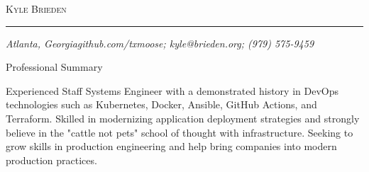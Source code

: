 \documentclass[10pt,oneside]{article}
\makeatletter
\newcommand{\name}{Kyle Brieden}
\newcommand{\addr}{Atlanta, Georgia}
\newcommand{\phone}{(979) 575-9459}
\newcommand{\email}{kyle@brieden.org}
\newcommand{\github}{github.com/txmoose}
\newcommand{\bigname}[1]{
    \begin{center}\fontfamily{phv}\selectfont\Huge\scshape#1\end{center}
}
\newenvironment{ressection}[1]{
    \vspace{4pt}
    {\fontfamily{phv}\selectfont\Large#1}
    \begin{itemize}
    \vspace{3pt}
}{
    \end{itemize}
}
\makeatother
\begin{document}
 \selectfont

\bigname{\name}

\vspace{-8pt} \rule{\textwidth}{1pt}

\vspace{-1pt} {\small\itshape \addr \hfill \github; \email; \phone}

\vspace{8 pt}

\begin{ressection}{Professional Summary}

    \begin{resobj}{Experienced Staff Systems Engineer with a demonstrated history in DevOps technologies such as Kubernetes, Docker, Ansible, GitHub Actions, and Terraform.  Skilled in modernizing application deployment strategies and strongly believe in the "cattle not pets" school of thought with infrastructure.  Seeking to grow skills in production engineering and help bring companies into modern production practices.}
   \end{resobj}

\end{ressection}
\end{document}
